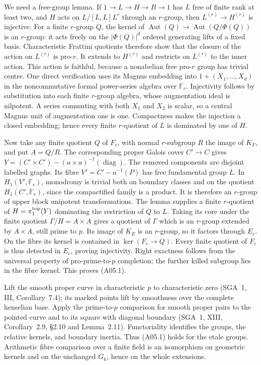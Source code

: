 \documentclass[11pt,a4paper]{article}
\begin{document}
We need a free-group lemma. If $1\to L\to H\to B\to1$ has $L$
free of finite rank at least two, and $H$ acts on
$L/[L,L]L^r$ through an $r$-group, then $L^{(r)}\to H^{(r)}$
is injective. For a finite $r$-group $Q$, the kernel of
$\operatorname{Aut}(Q)\to\operatorname{Aut}(Q/\Phi(Q))$ is an
$r$-group: it acts freely on the $|\Phi(Q)|^d$ ordered generating
lifts of a fixed basis. Characteristic Frattini quotients therefore
show that the closure of the action on $L^{(r)}$ is pro-$r$.
It extends to $H^{(r)}$ and restricts on $L^{(r)}$ to the inner
action. This action is faithful, because a nonabelian free pro-$r$
group has trivial centre. One direct verification uses its Magnus
embedding into $1+(X_1,\ldots,X_d)$ in the noncommutative formal
power-series algebra over $\mathbb F_r$. Injectivity follows by
substitution into each finite $r$-group algebra, whose augmentation
ideal is nilpotent. A series commuting with both $X_1$ and $X_2$
is scalar, so a central Magnus unit of augmentation one is one.
Compactness makes the injection a closed embedding; hence every
finite $r$-quotient of $L$ is dominated by one of $H$.

Now take any finite quotient $Q$ of $F_c$, with normal $r$-subgroup
$R$ the image of $K_F$, and put $A=Q/R$. The corresponding proper
Galois cover $C'\to C$ gives
$Y=(C'\times C')-(a\times a)^{-1}(\operatorname{diag})$.
The removed components are disjoint labelled graphs. Its fibre
$V'=C'-a^{-1}(P)$ has free fundamental group $L$. In
$H_1(V',\mathbb F_r)$, monodromy is trivial both on boundary
classes and on the quotient $H_1(C',\mathbb F_r)$, since the
compactified family is a product. It is therefore an $r$-group of
upper block unipotent transformations. The lemma supplies a finite
$r$-quotient of $H=\pi_1^{\rm top}(Y)$ dominating the restriction
of $Q$ to $L$. Taking its core under the finite quotient
$\Gamma/H=A\times A$ gives a quotient of $\Gamma$ which is an
$r$-group extended by $A\times A$, still prime to $p$.
Its image of $K_E$ is an $r$-group, so it factors through $E_c$.
On the fibre its kernel is contained in $\ker(F_c\to Q)$.
Every finite quotient of $F_c$ is thus detected in $E_c$, proving
injectivity. Right exactness follows from the universal property of
pro-prime-to-$p$ completion; the further killed subgroup lies in
the fibre kernel. This proves (A05.1).

Lift the smooth proper curve in characteristic $p$ to characteristic
zero (SGA~1, III, Corollary~7.4); its marked points lift by smoothness
over the complete henselian base. Apply the
prime-to-$p$ comparison for smooth proper pairs to the pointed
curve and to its square with diagonal boundary (SGA~1, XIII,
Corollary~2.9, \S2.10 and Lemma~2.11). Functoriality identifies
the groups, the relative kernels, and boundary inertia. Thus
(A05.1) holds for the etale groups. Arithmetic fibre comparison
over a finite field is an isomorphism on geometric kernels and
on the unchanged $G_k$, hence on the whole extensions.
\end{document}
